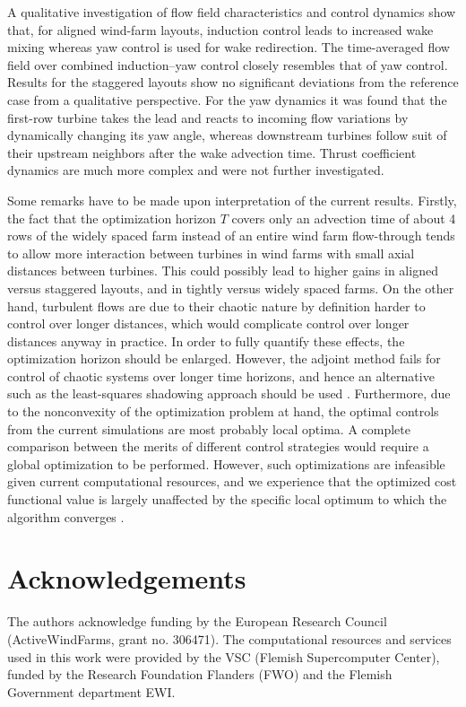 \documentclass[a4paper]{jpconf}
\begin{document}
A qualitative investigation of flow field characteristics and control dynamics show that, for aligned wind-farm layouts, induction control leads to increased wake mixing whereas yaw control is used for wake redirection. The time-averaged flow field over combined induction--yaw control closely resembles that of yaw control. Results for the staggered layouts show no significant deviations from the reference case from a qualitative perspective. For the yaw dynamics it was found that the first-row turbine takes the lead and reacts to incoming flow variations by dynamically changing its yaw angle, whereas downstream turbines follow suit of their upstream neighbors after the wake advection time. Thrust coefficient dynamics are much more complex and were not further investigated. 

Some remarks have to be made upon interpretation of the current results. Firstly, the fact that the optimization horizon $T$ covers only an advection time of about 4 rows of the widely spaced farm instead of an entire wind farm flow-through tends to allow more interaction between turbines in wind farms with small axial distances between turbines. This could possibly lead to higher gains in aligned versus staggered layouts, and in tightly versus widely spaced farms. On the other hand, turbulent flows are due to their chaotic nature by definition harder to control over longer distances, which would complicate control over longer distances anyway in practice. In order to fully quantify these effects, the optimization horizon should be enlarged. However, the adjoint method fails for control of chaotic systems over longer time horizons, and hence an alternative such as the least-squares shadowing approach should be used . Furthermore, due to the nonconvexity of the optimization problem at hand, the optimal controls from the current simulations are most probably local optima. A complete comparison between the merits of different control strategies would require a global optimization to be performed. However, such optimizations are infeasible given current computational resources, and we experience that the optimized cost functional value is largely unaffected by the specific local optimum to which the algorithm converges \cite{munters}. 

\section*{Acknowledgements}
The authors acknowledge funding by the European Research Council (ActiveWindFarms, grant no. 306471). The computational resources and services used in this work were provided by the VSC (Flemish Supercomputer Center), funded by the Research Foundation Flanders (FWO) and the Flemish Government department EWI. 
\end{document}
